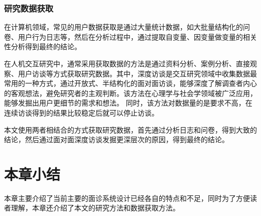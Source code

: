 \subsubsection{研究数据获取}
在计算机领域，常见的用户数据获取是通过大量统计数据，如大批量结构化的问卷、用户行为日志等，然后在分析过程中，通过提取自变量、因变量做变量的相关性分析得到最终的结论。

在人机交互研究中，通常采用获取数据的方法是通过资料分析、案例分析、直接观察、用户访谈等方式获取研究数据。其中，深度访谈是交互研究领域中收集数据最常用的一种方式，通过开放式、半结构化的面对面访谈，能够深度了解调查者内心的客观想法，避免研究者的主观判断。该方法在心理学与社会学领域被广泛应用，能够发掘出用户更细节的需求和想法。
同时，该方法对数据量的是要求不高，在连续访谈得到的结果比较稳定后就可以停止访谈。

本文使用两者相结合的方式获取研究数据，首先通过分析日志和问卷，得到大致的结论，然后通过面对面深度访谈发掘更深层次的原因，得到最终的结论。


\section{本章小结}
本章主要介绍了当前主要的面诊系统设计已经各自的特点和不足，同时为了方便读者理解，本章还介绍了本文的研究方法和数据获取方法。

